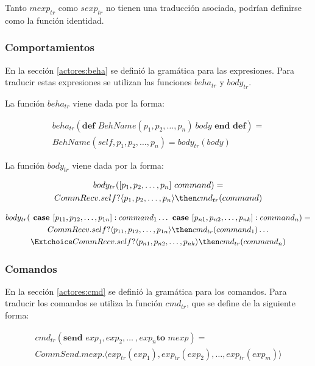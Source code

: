 Tanto $mexp_{tr}$ como $sexp_{tr}$ no tienen una traducción asociada, podrían definirse como la función identidad.

\subsubsection*{Comportamientos}
En la sección \ref{actores:beha} se definió la gramática para las expresiones. Para traducir estas expresiones se utilizan las funciones $beha_{tr}$ y $body_{tr}$.

La función $beha_{tr}$ viene dada por la forma:

\begin{multline*}
beha_{tr}(\textbf{def } BehName(p_1, p_2,\ldots, p_n)\ body \textbf{ end def}) = \\
BehName(self, p_1, p_2,\ldots, p_n) = body_{tr}(body) 
\end{multline*}

La función $body_{tr}$ viene dada por la forma:

\begin{multline*}
body_{tr}([ p_1, p_2,\ldots, p_n]\ command) = \\
 CommRecv.self?\langle p_1, p_2,\ldots, p_n \rangle \then cmd_{tr}(command)
\end{multline*}

\begin{multline*}
body_{tr}(\textbf{ case } [p_{11}, p_{12},\ldots, p_{1n}]: command_1 \ldots \textbf{ case } [p_{n1}, p_{n2},\ldots, p_{nk}]: command_n ) = \\
CommRecv.self?\langle p_{11}, p_{12},\ldots, p_{1n} \rangle \then cmd_{tr}(command_1) \ldots \\
\Extchoice CommRecv.self?\langle p_{n1}, p_{n2},\ldots, p_{nk} \rangle \then cmd_{tr}(command_n) 
\end{multline*}

\subsubsection*{Comandos}

En la sección \ref{actores:cmd} se definió la gramática para los comandos. Para traducir los comandos se utiliza la función $cmd_{tr}$, que se define de la siguiente forma:

\begin{multline*}
cmd_{tr} (\textbf{send } exp_1, exp_2, \ldots\ , exp_n \textbf{to } mexp) = \\
CommSend.mexp. \langle exp_{tr}(exp_1), exp_{tr}(exp_2), \ldots, exp_{tr}(exp_m) \rangle
\end{multline*}

